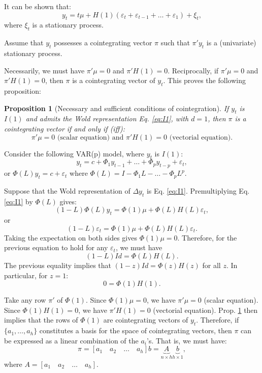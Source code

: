 \documentclass[
  11pt,
]{book}
\newtheorem{proposition}{Proposition}[chapter]
\theoremstyle{definition}
\theoremstyle{definition}
\theoremstyle{definition}
\theoremstyle{definition}
\theoremstyle{remark}
\begin{document}
It can be shown that:
\[
y_t = t \mu + H(1)(\varepsilon_t + \varepsilon_{t-1} + \dots + \varepsilon_1) + \xi_t,
\]
where \(\xi_t\) is a stationary process.

Assume that \(y_t\) possesses a cointegrating vector \(\pi\) such that \(\pi' y_t\) is a (univariate) stationary process.

Necessarily, we must have \(\pi' \mu = 0\) and \(\pi' H(1)=0\). Reciprocally, if \(\pi' \mu = 0\) and \(\pi' H(1)=0\), then \(\pi\) is a cointegrating vector of \(y_t\). This proves the following proposition:

\begin{proposition}[Necessary and sufficient conditions of cointegration]
\protect\hypertarget{prp:NScondCoint}{}\label{prp:NScondCoint}If \(y_t\) is \(I(1)\) and admits the Wold representation Eq. \eqref{eq:I1}, with \(d=1\), then \(\pi\) is a cointegrating vector if and only if (iff):
\[
\pi' \mu = 0 \mbox{ (scalar equation) and }\pi' H(1)=0\mbox{ (vectorial equation)}.
\]
\end{proposition}

Consider the following VAR(p) model, where \(y_t\) is \(I(1)\):
\begin{equation}
y_t = c + \Phi_1 y_{t-1} + \dots + \Phi_p y_{t-p} + \varepsilon_t,\label{eq:yVECM1}
\end{equation}
or \(\Phi(L)y_t = c + \varepsilon_t\) where \(\Phi(L) = I - \Phi_1 L - \dots - \Phi_p L^p\).

Suppose that the Wold representation of \(\Delta y_t\) is Eq. \eqref{eq:I1}. Premultiplying Eq. \eqref{eq:I1} by \(\Phi(L)\) gives:
\[
(1-L)\Phi(L)y_t = \Phi(1)\mu + \Phi(L)H(L)\varepsilon_t,
\]
or
\[
(1-L)\varepsilon_t = \Phi(1)\mu + \Phi(L)H(L)\varepsilon_t.
\]
Taking the expectation on both sides gives \(\Phi(1)\mu=0\). Therefore, for the previous equation to hold for any \(\varepsilon_t\), we must have
\[
(1-L) Id = \Phi(L)H(L).
\]
The previous equality implies that \((1-z) Id = \Phi(z)H(z)\) for all \(z\). In particular, for \(z=1\):
\[
0 = \Phi(1)H(1).
\]

Take any row \(\pi'\) of \(\Phi(1)\). Since \(\Phi(1)\mu=0\), we have \(\pi'\mu=0\) (scalar equation). Since \(\Phi(1)H(1)=0\), we have \(\pi' H(1)=0\) (vectorial equation). Prop. \ref{prp:NScondCoint} then implies that the rows of \(\Phi(1)\) are cointegrating vectors of \(y_t\). Therefore, if \(\{a_1,\dots,a_h\}\) constitutes a basis for the space of cointegrating vectors, then \(\pi\) can be expressed as a linear combination of the \(a_i\)'s. That is, we must have:
\[
\pi = [a_1 \quad a_2 \quad \dots \quad a_h]b = \underbrace{A}_{n\times h}\underbrace{b}_{h \times 1},
\]
where \(A = [a_1 \quad a_2 \quad \dots \quad a_h]\).
\end{document}
